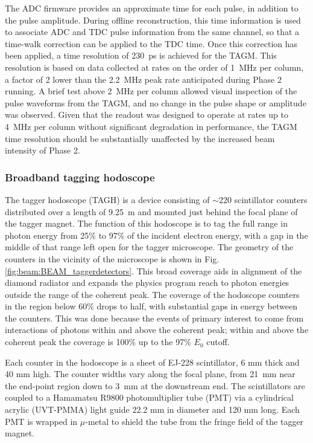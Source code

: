 The ADC firmware provides an approximate time for each pulse, in addition to the
pulse amplitude. During offline reconstruction, this time information is used to
associate ADC and TDC pulse information from the same channel, so that a
time-walk correction can be applied to the TDC time. Once this correction
has been applied, a time resolution of 230~ps is achieved for the TAGM.
This resolution is based on data collected at rates on the order of 1~MHz
per column, a factor of 2 lower than the 2.2~MHz peak rate anticipated during
\GX{} Phase 2 running. A brief test above 2~MHz per column allowed visual
inspection of the pulse waveforms from the TAGM, and no change in the
pulse shape or amplitude was observed. Given that the readout was designed
to operate at rates up to 4~MHz per column without significant degradation
in performance, the TAGM time resolution should be
substantially unaffected by the increased beam intensity of \GX{} Phase 2.

\subsubsection{Broadband tagging hodoscope}\label{sec:TAGHIntro}
The tagger hodoscope (TAGH) is a device consisting of $\sim$220 scintillator counters distributed over a length of 9.25~m and mounted just behind the focal plane of the tagger magnet.
The function of this hodoscope is to tag the full range in photon energy from 25\% to 97\%
of the incident electron energy, with a gap in the middle of that range
left open for the tagger microscope. The geometry of the counters in the
vicinity of the microscope is shown in Fig.\,\ref{fig:beam:BEAM_taggerdetectors}. 
This broad coverage aids in alignment of the diamond radiator and expands the \GX{} physics program reach to photon energies outside the range of the coherent peak.
The coverage of the hodoscope counters in the region below 60\% drops to half,
with substantial gaps in energy between the counters. This was done because
the events of primary interest to \GX{} come from interactions of photons
within and above the coherent peak; 
within and above the coherent peak the coverage is 100\% up to the 97\% $E_0$ cutoff.

Each counter in the hodoscope is a sheet of EJ-228 scintillator, 6 mm thick and
40 mm high. The counter widths vary along the focal plane, from 21~mm near the
end-point region down to 3~mm at the downstream end. The scintillators are
coupled to a Hamamatsu R9800 photomultiplier tube (PMT) via a cylindrical acrylic (UVT-PMMA) light
guide 22.2 mm in diameter and 120 mm long. Each PMT is wrapped in $\mu$-metal
to shield the tube from the fringe field of the tagger magnet.

